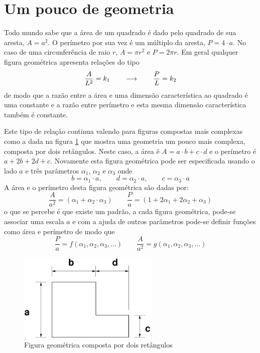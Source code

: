 \section{Um pouco de geometria}

Todo mundo sabe que a área de um quadrado é dado pelo quadrado de sua aresta, $A=a^2$. O perímetro por sua vez é um múltiplo da aresta, $P = 4\cdot a$. No caso de uma circunferência de raio $r$, $A = \pi r^2$ e $P = 2\pi r$. Em geral qualquer figura geométrica apresenta relações do tipo 
\[
\frac{A}{L^2} = k_1 \qquad\longrightarrow\qquad \frac{P}{L} = k_2
\]
de modo que a razão entre a área e uma dimensão característica ao quadrado é uma constante e a razão entre perímetro e esta mesma dimensão característica também é constante. 

Este tipo de relação continua valendo para figuras compostas mais complexas como a dada na figura \ref{fig:L2d} que mostra uma geometria um pouco mais complexa, composta por dois retângulos. Neste caso, a área é $A = a\cdot b + c\cdot d$ e o perímetro é $a + 2b + 2d + c$. Novamente esta figura geométrica pode ser especificada usando o lado $a$ e três parâmetros $\alpha_1$, $\alpha_2$ e $\alpha_3$ onde
\[
b = \alpha_1\cdot a, \qquad d = \alpha_2\cdot a, \qquad c = \alpha_3\cdot a
\]
A área e o perímetro desta figura geométrica são dadas por:
\[
\frac{A}{a^2} = (\alpha_1 + \alpha_2\cdot\alpha_3) \qquad \frac{P}{a} = (1 + 2\alpha_1+2\alpha_2+\alpha_3)
\]
o que se percebe é que existe um padrão, a cada figura geométrica, pode-se associar uma escala $a$ e com a ajuda de outros parâmetros pode-se definir funções como área e perímetro de modo que 
\[
\frac{P}{a} = f(\alpha_1, \alpha_2, \alpha_3, \ldots) \qquad \frac{A}{a^2} = g(\alpha_1, \alpha_2, \alpha_3, \ldots)
\]

\begin{figure}
\centering
\includegraphics[width=0.6\textwidth]{./figuras/L2d.pdf}
\caption{Figura geométrica composta por dois retângulos}
\label{fig:L2d}
\end{figure}

